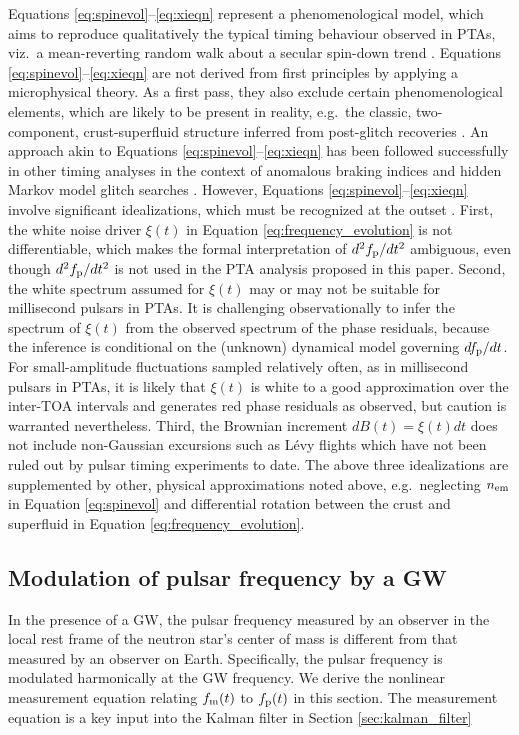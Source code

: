 \documentclass[fleqn,usenatbib,useAMS]{mnras}
\begin{document}
Equations \eqref{eq:spinevol}--\eqref{eq:xieqn} represent a phenomenological model, which aims to reproduce qualitatively the typical timing behaviour observed in PTAs, viz.\ a mean-reverting random walk about a secular spin-down trend \citep{NANOgrav2023,EPTA2023,Zic2023arXiv230616230Z}. Equations \eqref{eq:spinevol}--\eqref{eq:xieqn} are not derived from first principles by applying a microphysical theory. As a first pass, they also exclude certain phenomenological elements, which are likely to be present in reality, e.g.\ the classic, two-component, crust-superfluid structure inferred from post-glitch recoveries \citep{Baym1969,vanEysden,Alpar2017MNRAS.471.4827G}. An approach akin to Equations \eqref{eq:spinevol}--\eqref{eq:xieqn} has been followed successfully in other timing analyses in the context of anomalous braking indices \citep{Vargas} and hidden Markov model glitch searches \citep{Melatos2020ApJ...896...78M,Lower2021MNRAS.508.3251L,Dunn2022,Dunn2023MNRAS.522.5469D}. However, Equations \eqref{eq:spinevol}--\eqref{eq:xieqn}  involve significant idealizations, which must be recognized at the outset \citep{Meyers2021,Myers2021MNRAS.502.3113M,Vargas}. First, the white noise driver $\xi(t)$ in Equation \eqref{eq:frequency_evolution} is not differentiable, which makes the formal interpretation of $d^2 f_{\rm p} / dt^2$ ambiguous, even though $d^2 f_{\rm p} / dt^2$ is not used in the PTA analysis proposed in this paper. Second, the white spectrum assumed for $\xi(t)$ may or may not be suitable for millisecond pulsars in PTAs. It is challenging observationally to infer the spectrum of $\xi(t)$ from the observed spectrum of the phase residuals, because the inference is conditional on the (unknown) dynamical model governing $df_{\rm p}/dt$. For small-amplitude fluctuations sampled relatively often, as in millisecond pulsars in PTAs, it is likely that $\xi(t)$ is white to a good approximation over the inter-TOA intervals and generates red phase residuals as observed, but caution is warranted nevertheless. Third, the Brownian increment $dB(t)=\xi(t)dt$ does not include non-Gaussian excursions such as L\'{e}vy flights \citep{Sornette2004} which have not been ruled out by pulsar timing experiments to date. The above three idealizations are supplemented by other, physical approximations noted above, e.g.\ neglecting $n_{\rm em}$ in Equation \eqref{eq:spinevol} and differential rotation between the crust and superfluid in Equation \eqref{eq:frequency_evolution}.



\subsection{Modulation of pulsar frequency by a GW} \label{sec:psr_measured}
In the presence of a GW, the pulsar frequency measured by an observer in the local rest frame of the neutron star's center of mass is different from that measured by an observer on Earth. Specifically, the pulsar frequency is modulated harmonically at the GW frequency. We derive the nonlinear measurement equation relating $f_{\rm m}(t)$ to $f_{\rm p}(t)$ in this section. The measurement equation is a key input into the Kalman filter in Section \eqref{sec:kalman_filter}
\end{document}

